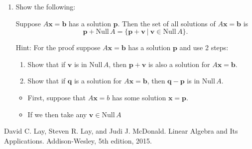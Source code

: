\documentclass[12pt,a4paper]{exam}
\newcommand{\bb}{\mathbf{b}}
\newcommand{\bp}{\mathbf{p}}
\newcommand{\bq}{\mathbf{q}}
\newcommand{\bv}{\mathbf{v}}
\newcommand{\bx}{\mathbf{x}}
\newcommand{\Nul}{\mathrm{Null\,}}
\begin{document}
\begin{enumerate}
\begin{solution}
\begin{enumerate}
  \end{enumerate}
\end{solution}



\item
Show the following:

\bigskip

 Suppose $A\bx=\bb$ has a solution $\mathbf{p}$. Then the set of all solutions of $A\bx=\bb$ is
\[ \mathbf{p}+\Nul A = \{\mathbf{p}+\mathbf{v}\ |\ \mathbf{v} \in \Nul A\}. \]

\bigskip

\noindent Hint: For the proof suppose $A\bx=\bb$ has a solution $\bp$ and use 2 steps:
\begin{enumerate}
\item Show that if $\bv$ is in $\Nul A$, then $\bp+\bv$ is also a solution for $A\bx=\bb$.
\item Show that if $\bq$ is a solution for $A\bx=\bb$, then $\mathbf{q}-\bp$ is in $\Nul A$.
\end{enumerate}
\begin{solution}
  \begin{itemize}
    \item First, suppose that $A\bx=b$ has some solution $\bx=\bp$.
    \item If we then take any $\bv\in\Nul A$ 
  \end{itemize}
\end{solution}
\end{enumerate}




\begin{thebibliography}{1}
 David C. Lay, Steven R. Lay, and Judi J. McDonald.
\newblock Linear Algebra and Its Applications.
\newblock Addison-Wesley, 5th edition, 2015.
\end{thebibliography}
\end{document}

